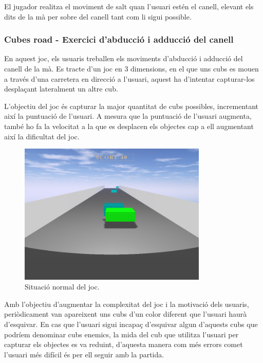 \documentclass[12pt,a4paper,catalan]{article}
\begin{document}
	El jugador realitza el moviment de salt quan l'usuari estén el canell, elevant els dits de la mà per sobre del canell tant com li sigui possible.
	\subsubsection{Cubes road - Exercici d'abducció i adducció del canell}
	En aquest joc, els usuaris treballen els moviments d'abducció i adducció del canell de la mà. Es tracte d'un joc en 3 dimensions, en el que uns cubs es mouen a través d'una carretera en direcció a l'usuari, aquest ha d'intentar capturar-los desplaçant lateralment un altre cub.
	
	L'objectiu del joc és capturar la major quantitat de cubs possibles, incrementant així la puntuació de l'usuari. A mesura que la puntuació de l'usuari augmenta, també ho fa la velocitat a la que es desplacen els objectes cap a ell augmentant així la dificultat del joc.
	\begin{figure}[H]
		\includegraphics[width=0.8\textwidth,keepaspectratio]{cubes-road-simple.png}
		\centering
		\caption{Situació normal del joc.}
		\label{fig:cubes-road-simple}
	\end{figure}
	Amb l'objectiu d'augmentar la complexitat del joc i la motivació dels usuaris, periòdicament van apareixent uns cubs d'un color diferent que l'usuari haurà d'esquivar. En cas que l'usuari sigui incapaç d'esquivar algun d'aquests cubs que podríem denominar cubs enemics, la mida del cub que utilitza l'usuari per capturar els objectes es va reduint, d'aquesta manera com més errors comet l'usuari més difícil és per ell seguir amb la partida.
	
\end{document}
